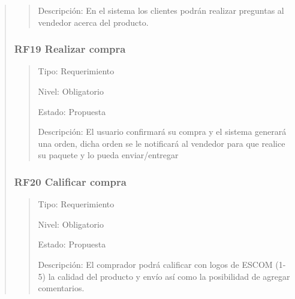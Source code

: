 \documentclass[14pt]{article}
\begin{document}
\begin{quote}
\begin{quote}
                        Descripción: En el sistema los clientes podrán realizar preguntas al vendedor acerca del producto.
                    \end{quote}
                \subsubsection{RF19 Realizar compra}\label{RF19 Realizar compra}
                    \begin{quote}
                        Tipo: Requerimiento
                        
                        Nivel: Obligatorio
                        
                        Estado: Propuesta
                        
                        Descripción: El usuario confirmará su compra y el sistema generará una orden, dicha orden se le notificará al vendedor para que realice su paquete y lo pueda enviar/entregar
                    \end{quote}
                \subsubsection{RF20 Calificar compra}\label{RF20 Calificar compra}
                    \begin{quote}
                        Tipo: Requerimiento
                        
                        Nivel: Obligatorio
                        
                        Estado: Propuesta
                        
                        Descripción: El comprador podrá calificar con logos de ESCOM (1-5) la calidad del producto y envío así como la posibilidad de agregar comentarios.
                    \end{quote}
            \end{quote}
\end{document}
